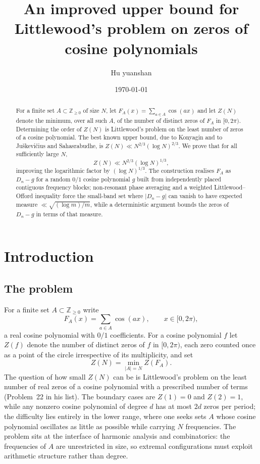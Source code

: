 \documentclass[11pt,reqno]{amsart}
\title{An improved upper bound for Littlewood's problem on zeros of cosine polynomials}
\author{Hu yuanshan}
\date{\today}
\theoremstyle{plain}
\theoremstyle{definition}
\theoremstyle{remark}
\begin{document}
\begin{abstract}
For a finite set $A\subset\mathbb{Z}_{\ge 0}$ of size $N$, let $F_A(x)=\sum_{a\in A}\cos(ax)$ and let $Z(N)$ denote the minimum, over all such $A$, of the number of distinct zeros of $F_A$ in $[0,2\pi)$. Determining the order of $Z(N)$ is Littlewood's problem on the least number of zeros of a cosine polynomial. The best known upper bound, due to Konyagin and to Ju\v{s}kevi\v{c}ius and Sahasrabudhe, is $Z(N)\ll N^{2/3}(\log N)^{2/3}$. We prove that for all sufficiently large $N$,
\[
Z(N)\ll N^{2/3}(\log N)^{1/3},
\]
improving the logarithmic factor by $(\log N)^{1/3}$. The construction realises $F_A$ as $D_n-g$ for a random $0/1$ cosine polynomial $g$ built from independently placed contiguous frequency blocks; non-resonant phase averaging and a weighted Littlewood--Offord inequality force the small-band set where $|D_n-g|$ can vanish to have expected measure $\ll\sqrt{(\log m)/m}$, while a deterministic argument bounds the zeros of $D_n-g$ in terms of that measure.
\end{abstract}

\maketitle

\section{Introduction}

\subsection*{The problem}
For a finite set $A\subset\mathbb{Z}_{\ge 0}$ write
\[
F_A(x)=\sum_{a\in A}\cos(ax),\qquad x\in[0,2\pi),
\]
a real cosine polynomial with $0/1$ coefficients. For a cosine polynomial $f$ let $Z(f)$ denote the number of distinct zeros of $f$ in $[0,2\pi)$, each zero counted once as a point of the circle irrespective of its multiplicity, and set
\[
Z(N)=\min_{\lvert A\rvert=N} Z(F_A).
\]
The question of how small $Z(N)$ can be is Littlewood's problem on the least number of real zeros of a cosine polynomial with a prescribed number of terms (Problem~22 in his list). The boundary cases are $Z(1)=0$ and $Z(2)=1$, while any nonzero cosine polynomial of degree $d$ has at most $2d$ zeros per period; the difficulty lies entirely in the lower range, where one seeks sets $A$ whose cosine polynomial oscillates as little as possible while carrying $N$ frequencies. The problem sits at the interface of harmonic analysis and combinatorics: the frequencies of $A$ are unrestricted in size, so extremal configurations must exploit arithmetic structure rather than degree.
\end{document}
